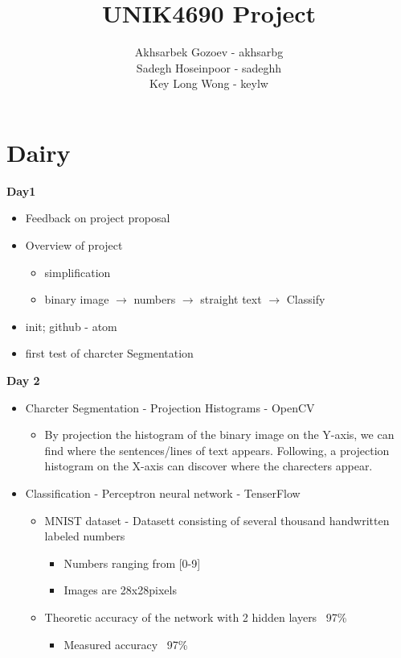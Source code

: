 \documentclass[11pt,a4paper,english]{article}
\title{UNIK4690 Project}
\author{
  Akhsarbek Gozoev  - akhsarbg \\
  Sadegh Hoseinpoor - sadeghh\\
  Key Long Wong - keylw
}
\newenvironment{loggentry}[2]%
{\noindent\textbf{#2}\marginnote{#1}\\}{\vspace{0.5cm}}
\begin{document}
\maketitle
\section*{Dairy}

\begin{loggentry}{19.04.18}{Day1}
\begin{itemize}
  \item{Feedback on project proposal}
  \item{Overview of project}
    \begin{itemize}
     \item{simplification}
     \item{binary image $\rightarrow$ numbers $\rightarrow$ straight text $\rightarrow$ Classify}
   \end{itemize}
  \item{init; github - atom}
  \item{first test of charcter Segmentation}
\end{itemize}
\end{loggentry}

\begin{loggentry}{26.04.18}{Day 2}
\begin{itemize}
  \item{Charcter Segmentation - Projection Histograms - OpenCV}
  \begin{itemize}
    \item{By projection the histogram of the binary image on the Y-axis,
    we can find where the sentences/lines of text appears. Following, a
    projection histogram on the X-axis can discover where the charecters
    appear.}
  \end{itemize}
  \item{Classification - Perceptron neural network - TenserFlow}
    \begin{itemize}
      \item{MNIST dataset - Datasett consisting of several thousand handwritten
      labeled numbers}
      \begin{itemize}
        \item{Numbers ranging from [0-9]}
        \item{Images are 28x28pixels}
      \end{itemize}
      \item{Theoretic accuracy of the network with 2 hidden layers ~97\%}
      \begin{itemize}
        \item{Measured accuracy ~97\%}
      \end{itemize}
    \end{itemize}
\end{itemize}
\end{loggentry}
\end{document}
